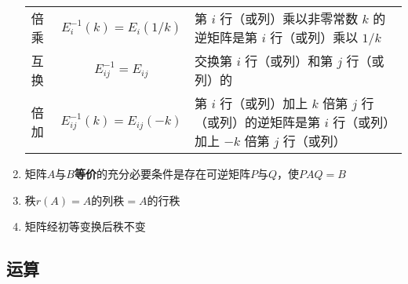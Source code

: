 \documentclass[a4paper,12pt]{article}
\begin{document}
\begin{enumerate}
        \renewcommand{\arraystretch}{1.2}  %
        \begin{tabularx}{\textwidth}{l c >{\raggedright\arraybackslash}X}
            倍乘 & $E_i^{-1}(k) = E_i(1/k)$      & 第 $i$ 行（或列）乘以非零常数 $k$ 的逆矩阵是第 $i$ 行（或列）乘以 $1/k$                     \\
            互换 & $E_{ij}^{-1} = E_{ij}$        & 交换第 $i$ 行（或列）和第 $j$ 行（或列）的\textbf{\color{red}{逆矩阵是其本身}}            \\
            倍加 & $E_{ij}^{-1}(k) = E_{ij}(-k)$ & 第 $i$ 行（或列）加上 $k$ 倍第 $j$ 行（或列）的逆矩阵是第 $i$ 行（或列）加上 $-k$ 倍第 $j$ 行（或列） \\
        \end{tabularx}
        \item 矩阵$A$与$B$\textbf{等价}的充分必要条件是存在可逆矩阵$P$与$Q$，使$PAQ = B$
        \item 秩$r(A) = A \text{的列秩} = A \text{的行秩}$
        \item 矩阵经初等变换后秩不变
    \end{enumerate}

    \subsection{运算}
\end{document}

